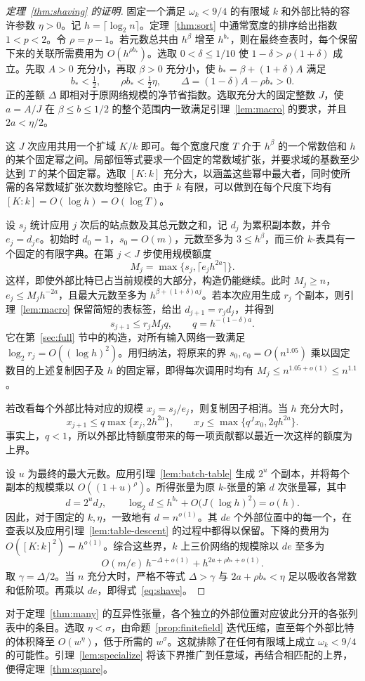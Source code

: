 \begin{proof}[定理~\ref{thm:shaving} 的证明]
固定一个满足 $\omega_k<9/4$ 的有限域 $k$ 和外部比特的容许参数 $\eta>0$。记 $h=\lceil\log_2 n\rceil$。定理~\ref{thm:sort} 中通常宽度的排序给出指数 $1<p<2$。令 $\rho=p-1$。若元数总共由 $h^\beta$ 增至 $h^{b_*}$，则在最终查表时，每个保留下来的关联所需费用为 $O(h^{\rho b_*})$。选取 $0<\delta\le1/10$ 使 $1-\delta>\rho(1+\delta)$ 成立。先取 $A>0$ 充分小，再取 $\beta>0$ 充分小，使 $b_*=\beta+(1+\delta)A$ 满足
\begin{equation}\label{eq:shaving-margins}
 b_*<\tfrac12,\qquad \rho b_*<\tfrac12\eta,\qquad
 \Delta=(1-\delta)A-\rho b_*>0 .
\end{equation}
正的差额 $\Delta$ 即相对于原网络规模的净节省指数。选取充分大的固定整数 $J$，使 $a=A/J$ 在 $\beta\le b\le1/2$ 的整个范围内一致满足引理~\ref{lem:macro} 的要求，并且 $2a<\eta/2$。

这 $J$ 次应用共用一个扩域 $K/k$ 即可。每个宽度尺度 $T$ 介于 $h^\beta$ 的一个常数倍和 $h$ 的某个固定幂之间。局部恒等式要求一个固定的常数域扩张，并要求域的基数至少达到 $T$ 的某个固定幂。选取 $[K:k]$ 充分大，以涵盖这些幂中最大者，同时使所需的各常数域扩张次数均整除它。由于 $k$ 有限，可以做到在每个尺度下均有 $[K:k]=O(\log h)=O(\log T)$。

设 $s_j$ 统计应用 $j$ 次后的站点数及其总元数之和，记 $d_j$ 为累积副本数，并令 $e_j=d_j e$。初始时 $d_0=1$，$s_0=O(m)$，元数至多为 $3\le h^\beta$，而三价 $k$-表具有一个固定的有限字典。在第 $j<J$ 步使用规模额度
\[
 M_j=\max\{s_j,\lceil e_j h^{2a}\rceil\}.
\]
这样，即使外部比特已占当前规模的大部分，构造仍能继续。此时 $M_j\ge n$，$e_j\le M_j h^{-2a}$，且最大元数至多为 $h^{\beta+(1+\delta)aj}$。若本次应用生成 $r_j$ 个副本，则引理~\ref{lem:macro} 保留简短的表标签，给出 $d_{j+1}=r_jd_j$，并得到
\[
 s_{j+1}\le r_j M_j q,\qquad q=h^{-(1-\delta)a}.
\]
它在第~\ref{sec:full} 节中的构造，对所有输入网络一致满足 $\log_2 r_j=O((\log h)^2)$。用归纳法，将原来的界 $s_0,e_0=O(n^{1.05})$ 乘以固定数目的上述复制因子及 $h$ 的固定幂，即得每次调用时均有 $M_j\le n^{1.05+o(1)}\le n^{1.1}$。

若改看每个外部比特对应的规模 $x_j=s_j/e_j$，则复制因子相消。当 $h$ 充分大时，
\[
 x_{j+1}\le q\max\{x_j,2h^{2a}\},\qquad
 x_J\le \max\{q^J x_0,2q h^{2a}\}.
\]
事实上，$q<1$，所以外部比特额度带来的每一项贡献都以最近一次这样的额度为上界。

设 $u$ 为最终的最大元数。应用引理~\ref{lem:batch-table} 生成 $2^u$ 个副本，并将每个副本的规模乘以 $O((1+u)^\rho)$。所得张量为原 $k$-张量的第 $d$ 次张量幂，其中
\[
 d=2^u d_J,\qquad
 \log_2 d\le h^{b_*}+O\bigl(J(\log h)^2\bigr)=o(h).
\]
因此，对于固定的 $k,\eta$，一致地有 $d=n^{o(1)}$。其 $de$ 个外部位置中的每一个，在查表以及应用引理~\ref{lem:table-descent} 的过程中都得以保留。下降的费用为 $O([K:k]^2)=h^{o(1)}$。综合这些界，$k$ 上三价网络的规模除以 $de$ 至多为
\[
 O(m/e)\,h^{-\Delta+o(1)}
       +h^{2a+\rho b_*+o(1)} .
\]
取 $\gamma=\Delta/2$。当 $n$ 充分大时，严格不等式 $\Delta>\gamma$ 与 $2a+\rho b_*<\eta$ 足以吸收各常数和低阶项。再乘以 $de$，即得式~\eqref{eq:shave}。
\end{proof}

对于定理~\ref{thm:many} 的互异性张量，各个独立的外部位置对应彼此分开的各张列表中的条目。选取 $\eta<\sigma$，由命题~\ref{prop:finitefield} 迭代压缩，直至每个外部比特的体积降至 $O(w^\eta)$，低于所需的 $w^\sigma$。这就排除了在任何有限域上成立 $\omega_k<9/4$ 的可能性。引理~\ref{lem:specialize} 将该下界推广到任意域，再结合相匹配的上界，便得定理~\ref{thm:square}。
